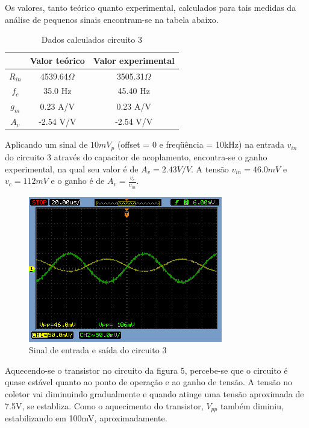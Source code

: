 \documentclass[a4paper]{article} %
\begin{document}
%
Os valores, tanto teórico quanto experimental, calculados para tais medidas da análise
de pequenos sinais encontram-se na tabela abaixo.
\begin{table}[h!]
\begin{centering}
\begin{tabular}{ccc}
\hline 
 & Valor teórico & Valor experimental\tabularnewline
\hline
\hline 
$R_{in}$ & 4539.64$\Omega$ & 3505.31$\Omega$\tabularnewline
$f_{c}$ & 35.0 Hz & 45.40 Hz\tabularnewline
$g_{m}$ & 0.23 A/V & 0.23 A/V\tabularnewline
$A_{v}$ & -2.54 V/V & -2.54 V/V\tabularnewline
\hline
\end{tabular}
\par\end{centering}

\caption{Dados calculados circuito 3}

\end{table}



Aplicando um sinal de $10mV_p$ (offset = 0 e freqüência = 10kHz) na entrada $v_{in}$
do circuito 3 através do capacitor de acoplamento, encontra-se o ganho experimental, na qual seu
valor é de $A_v=2.43V/V$. A tensão  $v_{in}=46.0mV$ e  $v_c=112mV$ e o ganho é de $A_v=\frac{v_c}{v_{in}}$.


\begin{figure}[h!]
\begin{centering}
\includegraphics[scale=0.5]{figuras03/3} \caption{Sinal de entrada e saída do circuito 3 \label{fig:2}}
\par\end{centering}
\end{figure}

Aquecendo-se o transistor no circuito da figura 5, percebe-se que o circuito é quase
estável quanto ao ponto de operação e ao ganho de tensão. A tensão no coletor vai
diminuindo gradualmente e quando atinge uma tensão aproximada de 7.5V,
se establiza.
Como o aquecimento do transistor, $V_{pp}$ também diminiu, estabilizando em 100mV,
aproximadamente.
\end{document}
